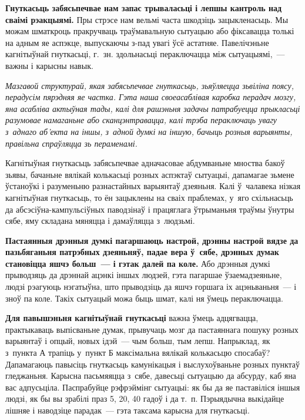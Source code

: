 \textbf{Гнуткасьць забясьпечвае нам запас трываласьці і лепшы кантроль над сваімі рэакцыямі.} Пры стрэсе нам вельмі часта шкодзіць зацыкленасьць. Мы можам шматкроць пракручваць траўмавальную сытуацыю або фіксавацца толькі на адным яе аспэкце, выпускаючы з-пад увагі ўсё астатняе. Павелічэньне кагнітыўнай гнуткасьці, г.~зн. здольнасьці пераключацца між сытуацыямі,~--- важны і карысны навык. 

\emph{Мазгавой структурай, якая забясьпечвае гнуткасьць, зьяўляецца зьвіліна поясу, перадусім пярэдняя яе частка. Гэта наша своеасаблівая каробка перадач мозгу, яна асабліва актыўная тады, калі для рашэньня задачы патрабуецца прыкласьці разумовае намаганьне або сканцэнтравацца, калі трэба пераключаць увагу з~аднаго аб'екта на іншы, з~адной думкі на іншую, бачыць розныя варыянты, правільна спраўляцца зь пераменамі.}

Кагнітыўная гнуткасьць забясьпечвае адначасовае абдумваньне мноства бакоў зьявы, бачаньне вялікай колькасьці розных аспэктаў сытуацыі, дапамагае зьмене ўстаноўкі і разуменьню разнастайных варыянтаў дзеяньня. Калі ў~чалавека нізкая кагнітыўная гнуткасьць, то ён зацыклены на сваіх праблемах, у~яго схільнасьць да абсэсіўна-кампульсіўных паводзінаў і працяглага ўтрыманьня траўмы ўнутры сябе, яму складана мяняцца і дамаўляцца з~людзьмі.

\textbf{Пастаянныя дрэнныя думкі пагаршаюць настрой, дрэнны настрой вядзе да пазьбяганьня патрэбных дзеяньняў, падае вера ў~сябе, дрэнных думак становіцца яшчэ больш~--- і гэтак далей па коле.} Або дрэнныя думкі прыводзяць да дрэннай ацэнкі іншых людзей, гэта пагаршае ўзаемадзеяньне, людзі рэагуюць нэгатыўна, што прыводзіць да яшчэ горшага іх ацэньваньня~--- і зноў па коле. Такіх сытуацый можа быць шмат, калі ня ўмець пераключацца.

\textbf{Для павышэньня кагнітыўнай гнуткасьці} важна ўмець адцягвацца, практыкаваць выпісваньне думак, прывучаць мозг да пастаяннага пошуку розных варыянтаў і опцый, новых ідэй~--- чым больш, тым лепш. Напрыклад, як з~пункта А трапіць у~пункт Б максімальна вялікай колькасьцю спосабаў? Дапамагаюць павысіць гнуткасьць камунікацыя і выслухоўваньне розных пунктаў гледжаньня. Карысна пасьмяяцца з~сябе, давесьці сытуацыю да абсурду, каб яна вас адпусьціла. Паспрабуйце рэфрэймінг сытуацыі: як бы да яе паставіліся іншыя людзі, як бы вы зрабілі праз 5, 20, 40 гадоў і да т.~п. Пэрыядычна выкідайце лішняе і наводзіце парадак~--- гэта таксама карысна для гнуткасьці. 


